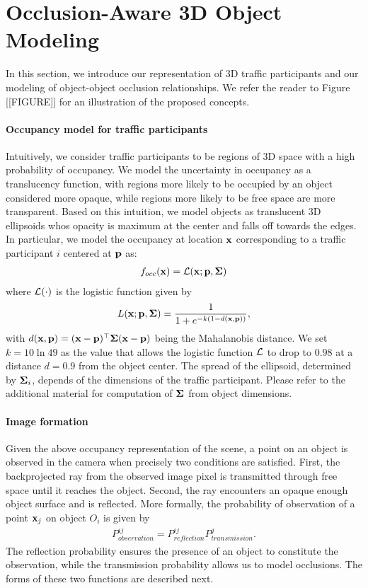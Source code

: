 \section{Occlusion-Aware 3D Object Modeling}
\label{sec:TPmodel}

In this section, we introduce our representation of 3D traffic participants and our modeling of object-object occlusion relationships. We refer the reader to Figure [[FIGURE]] for an illustration of the proposed concepts.

\paragraph{Occupancy model for traffic participants}
Intuitively, we consider traffic participants to be regions of 3D space with a high probability of occupancy. We model the uncertainty in occupancy as a translucency function, with regions more likely to be occupied by an object considered more opaque, while regions more likely to be free space are more transparent. Based on this intuition, we model objects as translucent 3D ellipsoids whos opacity is maximum at the center and falls off towards the edges. In particular, we model the occupancy at location $\mathbf{x}$ corresponding to a traffic participant $i$ centered at $\mathbf{p}$ as:
\begin{align}
  f_{occ}(\mathbf{x}) = \mathcal{L}(\mathbf{x}; \mathbf{p}, \bm{\Sigma})
\end{align}
where $\mathcal{L}(\cdot)$ is the logistic function given by
\begin{align}
  L(\mathbf{x}; \mathbf{p}, \bm{\Sigma}) = \frac{1}{1 + e^{-k(1 - d(\mathbf{x},\mathbf{p}))}},
\end{align}
with $d(\mathbf{x}, \mathbf{p}) = (\mathbf{x}-\mathbf{p})^\top\bm{\Sigma}(\mathbf{x}-\mathbf{p})$ being the Mahalanobis distance. We set $k = 10\ln{49}$ as the value that allows the logistic function $\mathcal{L}$ to drop to $0.98$ at a distance $d = 0.9$ from the object center. The spread of the ellipsoid, determined by $\bm{\Sigma}_i$, depends of the dimensions of the traffic participant. Please refer to the additional material for computation of $\bm{\Sigma}$ from object dimensions.


\paragraph{Image formation}
Given the above occupancy representation of the scene, a point on an object is observed in the camera when precisely two conditions are satisfied. First, the backprojected ray from the observed image pixel is transmitted through free space until it reaches the object. Second, the ray encounters an opaque enough object surface and is reflected. More formally, the probability of observation of a point $\mathbf{x}_j$ on object $O_i$ is given by
\begin{align}
P^{ij}_{\textit{observation}} = P^{ij}_{\textit{reflection}}P^{j}_{\textit{transmission}}.
\label{eq:imgform}
\end{align}
The reflection probability ensures the presence of an object to constitute the observation, while the transmission probability allows us to model occlusions. The forms of these two functions are described next.


